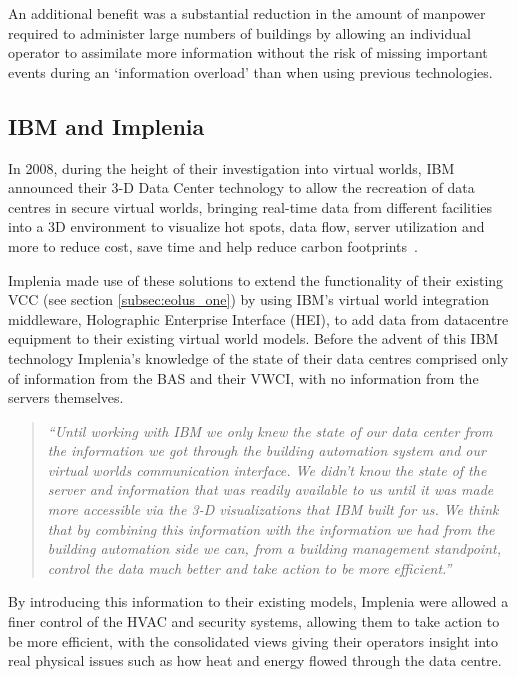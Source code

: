 An additional benefit was a substantial reduction in the amount of manpower required to administer large numbers of buildings by allowing an individual operator to assimilate more information without the risk of missing important events during an `information overload' than when using previous technologies.

\subsection{IBM and Implenia}
In 2008, during the height of their investigation into virtual worlds, IBM announced their 3-D Data Center technology to allow the recreation of data centres in secure virtual worlds, bringing real-time data from different facilities into a 3D environment to visualize hot spots, data flow, server utilization and more to reduce cost, save time and help reduce carbon footprints~\cite{IBM2008, Marketwire2008}.
	
Implenia made use of these solutions to extend the functionality of their existing VCC (see section \ref{subsec:eolus_one}) by using IBM's virtual world integration middleware, Holographic Enterprise Interface (HEI), to add data from datacentre equipment to their existing virtual world models. Before the advent of this IBM technology Implenia's knowledge of the state of their data centres comprised only of information from the BAS and their VWCI, with no information from the servers themselves.

\begin{quotation}
	\textit{``Until working with IBM we only knew the state of our data center from the information we got through the building automation system and our virtual worlds communication interface. We didn't know the state of the server and information that was readily available to us until it was made more accessible via the 3-D visualizations that IBM built for us. We think that by combining this information with the information we had from the building automation side we can, from a building management standpoint, control the data much better and take action to be more efficient.''}~\cite{Marketwire2008}
\end{quotation}
	
By introducing this information to their existing models, Implenia were allowed a finer control of the HVAC and security systems, allowing them to take action to be more efficient, with the consolidated views giving their operators insight into real physical issues such as how heat and energy flowed through the data centre.

